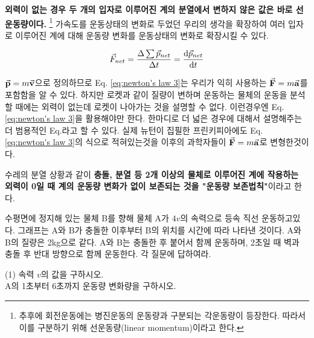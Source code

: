 \begin{flushleft}
\textbf{외력이 없는 경우 두 개의 입자로 이루어진 계의 분열에서 변하지 않은 값은 바로 선운동량이다.}
\footnote{추후에 회전운동에는 병진운동의 운동량과 구분되는
각운동량이 등장한다. 따라서 이를 구분하기 위해 선운동량(linear momentum)이라고 한다.}
가속도를 운동상태의 변화로 두었던 우리의 생각을 확장하여 여러 입자로 이루어진 계에 대해 운동량 변화를 
운동상태의 변화로 확장시킬 수 있다. 

    \begin{defn}
    \begin{equation}\label{eq:newton's law 3}
      \vec{F}_{net}
      =\frac{\Delta \sum \vec{p}_{net}}{\Delta t}=\dv{\vec{p}_{net}}{t}
    \end{equation}
  \end{defn}
  
   $\va{p}=m\va{v}$으로 정의하므로 Eq. \ref{eq:newton's law 3}는 우리가 익히 사용하는 $\va{F} =m\va{a}$를 포함함을 알 수 있다.
  하지만 로켓과 같이 질량이 변하며 운동하는 물체의 운동을 분석할 때에는 외력이 없는데 로켓이 나아가는 것을 설명할 수 없다.
  이런경우엔 Eq. \ref{eq:newton's law 3}을 활용해야만 한다. 한마디로 더 넓은 경우에 대해서 설명해주는 더 범용적인 Eq.라고 할 수 있다. 
  실제 뉴턴이 집필한 프린키피아에도 Eq. \ref{eq:newton's law 3}의 식으로 적혀있는것을 이후의 과학자들이 $\va{F} =m\va{a}$로 
  변형한것이다.  

  \noindent 
  수레의 분열 상황과 같이 \textbf{충돌, 분열 등 2개 이상의 물체로 이루어진 계에 작용하는 외력이 0일 때
   계의 운동량 변화가 없이 보존되는 것을 "운동량 보존법칙"}이라고 한다. 

   \begin{task}
    
  \begin{flushleft}
     수평면에 정지해 있는 물체 B를 향해 물체 A가 $4v$의 속력으로 등속 직선 운동하고있다. 그래프는 A와 B가 충돌한 이후부터 
     B의 위치를 시간에 따라 나타낸 것이다. A와 B의 질량은 2kg으로 같다. A와 B는 충돌한 후 붙어서 함께 운동하며, 2초일 때 벽과 
     충돌 후 반대 방향으로 함께 운동한다. 각 질문에 답하여라. 
  
 \begin{tasks}[label=(\arabic*)](1)
      \task 속력 $v$의 값을 구하시오. \\
      \task A의 1초부터 6초까지 운동량 변화량을 구하시오.\\
   \end{tasks}
    
 \end{flushleft}
\end{task}
\end{flushleft}

